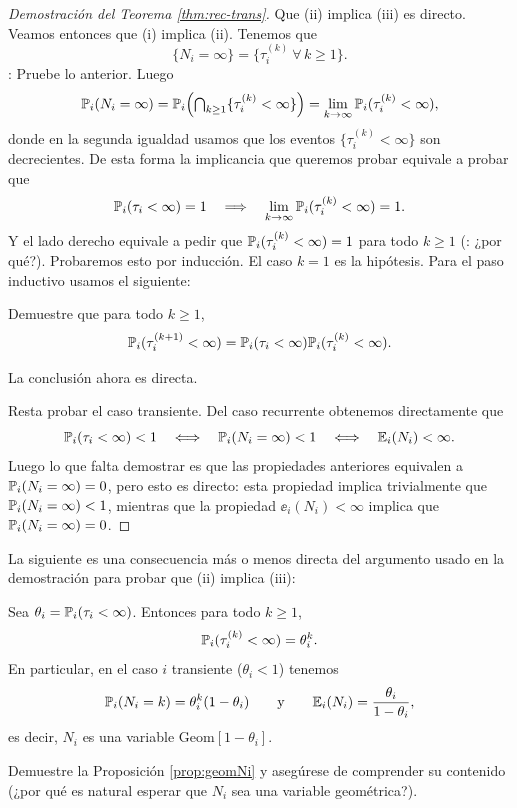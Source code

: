 \begin{proof}[Demostración del Teorema \ref{thm:rec-trans}]
Que (ii) implica (iii) es directo.
Veamos entonces que (i) implica (ii).
Tenemos que
\[\{N_i=\infty\}=\{\tau_i^{(k)}~\forall\,k\geq1\}.\]
\uexer: Pruebe lo anterior.
Luego
\[\mathbb{P}_i(N_i=\infty)=\mathbb{P}_i\Big({\textstyle\bigcap_{k\geq1}}\{\tau^{(k)}_i<\infty\}\Big)=\lim_{k\to\infty}\mathbb{P}_i(\tau^{(k)}_i<\infty),\]
donde en la segunda igualdad usamos que los eventos $\{\tau^{(k)}_i<\infty\}$ son decrecientes.
De esta forma la implicancia que queremos probar equivale a probar que 
\begin{equation}
\mathbb{P}_i(\tau_i<\infty)=1\quad\Longrightarrow\quad\lim_{k\to\infty}\mathbb{P}_i(\tau^{(k)}_i<\infty)=1.
\end{equation}
Y el lado derecho equivale a pedir que $\mathbb{P}_i(\tau^{(k)}_i<\infty)=1$ para todo $k\geq1$ (\uexers: ¿por qué?).
Probaremos esto por inducción.
El caso $k=1$ es la hipótesis.
Para el paso inductivo usamos el siguiente:
\begin{exer}
Demuestre que para todo $k\geq1$,
\[\mathbb{P}_i(\tau^{(k+1)}_i<\infty)=\mathbb{P}_i(\tau_i<\infty)\mathbb{P}_i(\tau^{(k)}_i<\infty).\]
\end{exer}
\noindent La conclusión ahora es directa.

Resta probar el caso transiente.
Del caso recurrente obtenemos directamente que
\[\mathbb{P}_i(\tau_i<\infty)<1\quad\Longleftrightarrow\quad\mathbb{P}_i(N_i=\infty)<1\quad\Longleftrightarrow\quad\mathbb{E}_i(N_i)<\infty.\]
Luego lo que falta demostrar es que las propiedades anteriores equivalen a $\mathbb{P}_i(N_i=\infty)=0$, pero esto es directo: esta propiedad implica trivialmente que $\mathbb{P}_i(N_i=\infty)<1$, mientras que la propiedad $\ee_i(N_i)<\infty$ implica que $\mathbb{P}_i(N_i=\infty)=0$.
\end{proof}

La siguiente es una consecuencia más o menos directa del argumento usado en la demostración para probar que (ii) implica (iii):

\begin{prop}\label{prop:geomNi}
Sea $\theta_i=\mathbb{P}_i(\tau_i<\infty)$.
Entonces para todo $k\geq1$,
\[\mathbb{P}_i(\tau^{(k)}_i<\infty)=\theta_i^k.\]
En particular, en el caso $i$ transiente ($\theta_i<1$) tenemos
\[\mathbb{P}_i(N_i=k)=\theta_i^k(1-\theta_i)\qquad\text{y}\qquad\mathbb{E}_i(N_i)=\frac{\theta_i}{1-\theta_i},\]
es decir, $N_i$ es una variable Geom$[1-\theta_i]$.
\end{prop}

\begin{exer}
Demuestre la Proposición \ref{prop:geomNi} y asegúrese de comprender su contenido (¿por qué es natural esperar que $N_i$ sea una variable geométrica?).
\end{exer}

